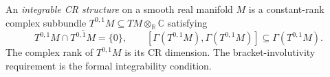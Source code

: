 
An \emph{integrable CR structure} on a smooth real manifold $M$ is a constant-rank complex subbundle $T^{0,1}M\subseteq TM\otimes_{\mathbb R}\mathbb C$ satisfying
\[
T^{0,1}M\cap\overline{T^{0,1}M}=\{0\},\qquad
[\Gamma(T^{0,1}M),\Gamma(T^{0,1}M)]\subseteq\Gamma(T^{0,1}M).
\]
The complex rank of $T^{0,1}M$ is its CR dimension. The bracket-involutivity requirement is the formal integrability condition.
